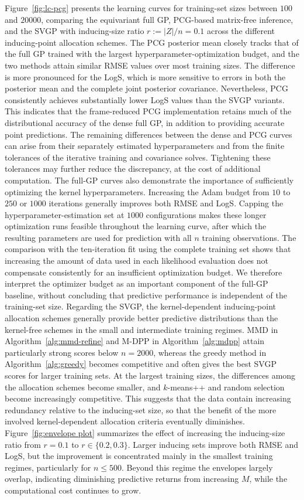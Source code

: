 \documentclass[11pt,a4paper]{article}
\begin{document}
Figure~\ref{fig:lc-pcg} presents the learning curves for training-set sizes between $100$ and $20000$, comparing the equivariant full GP, PCG-based matrix-free inference, and the SVGP with inducing-size ratio $r:=|Z|/n=0.1$ across the different inducing-point allocation schemes. The PCG posterior mean closely tracks that of the full GP trained with the largest hyperparameter-optimization budget, and the two methods attain similar RMSE values over most training sizes. The difference is more pronounced for the LogS, which is more sensitive to errors in both the posterior mean and the complete joint posterior covariance. Nevertheless, PCG consistently achieves substantially lower LogS values than the SVGP variants. This indicates that the frame-reduced PCG implementation retains much of the distributional accuracy of the dense full GP, in addition to providing accurate point predictions. The remaining differences between the dense and PCG curves can arise from their separately estimated hyperparameters and from the finite tolerances of the iterative training and covariance solves. Tightening these tolerances may further reduce the discrepancy, at the cost of additional computation. The full-GP curves also demonstrate the importance of sufficiently optimizing the kernel hyperparameters. Increasing the Adam budget from $10$ to $250$ or $1000$ iterations generally improves both RMSE and LogS. Capping the hyperparameter-estimation set at $1000$ configurations makes these longer optimization runs feasible throughout the learning curve, after which the resulting parameters are used for prediction with all $n$ training observations. The comparison with the ten-iteration fit using the complete training set shows that increasing the amount of data used in each likelihood evaluation does not compensate consistently for an insufficient optimization budget. We therefore interpret the optimizer budget as an important component of the full-GP baseline, without concluding that predictive performance is independent of the training-set size. Regarding the SVGP, the kernel-dependent inducing-point allocation schemes generally provide better predictive distributions than the kernel-free schemes in the small and intermediate training regimes. MMD in Algorithm~\ref{alg:mmd-refine} and M-DPP in Algorithm~\ref{alg:mdpp} attain particularly strong scores below $n=2000$, whereas the greedy method in Algorithm~\ref{alg:greedy} becomes competitive and often gives the best SVGP scores for larger training sets. At the largest training sizes, the differences among the allocation schemes become smaller, and $k$-means++ and random selection become increasingly competitive. This suggests that the data contain increasing redundancy relative to the inducing-set size, so that the benefit of the more involved kernel-dependent allocation criteria eventually diminishes. Figure~\ref{fig:envelope plot} summarizes the effect of increasing the inducing-size ratio from $r=0.1$ to $r\in\{0.2,0.3\}$. Larger inducing sets improve both RMSE and LogS, but the improvement is concentrated mainly in the smallest training regimes, particularly for $n\leq500$. Beyond this regime the envelopes largely overlap, indicating diminishing predictive returns from increasing $M$, while the computational cost continues to grow. 
\end{document}

